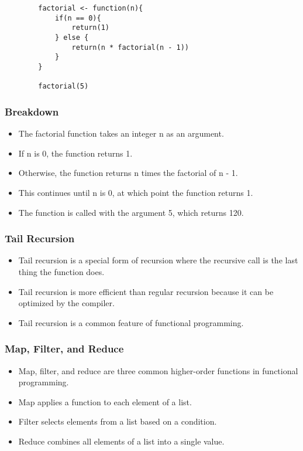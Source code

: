 \documentclass[serif, 9pt, aspectratio=32]{beamer}
\begin{document}
\begin{frame}[fragile]
    \begin{lstlisting}
        factorial <- function(n){
            if(n == 0){
                return(1)
            } else {
                return(n * factorial(n - 1))
            }
        }

        factorial(5)
    \end{lstlisting}
\end{frame}

\begin{frame}
    \centering
    \frametitle{Breakdown}
    \begin{itemize}
        \setlength{\itemsep}{2em}
        \item The factorial function takes an integer n as an argument.
        \item If n is 0, the function returns 1.
        \item Otherwise, the function returns n times the factorial of n - 1.
        \item This continues until n is 0, at which point the function returns 1.
        \item The function is called with the argument 5, which returns 120.
    \end{itemize}
\end{frame}

\begin{frame}
    \centering
    \frametitle{Tail Recursion}
    \begin{itemize}
        \setlength{\itemsep}{2em}
        \item Tail recursion is a special form of recursion where the recursive call is the last thing the function does.
        \item Tail recursion is more efficient than regular recursion because it can be optimized by the compiler.
        \item Tail recursion is a common feature of functional programming.
    \end{itemize}
\end{frame}

\begin{frame}
    \centering
    \frametitle{Map, Filter, and Reduce}
    \begin{itemize}
        \setlength{\itemsep}{2em}
        \item Map, filter, and reduce are three common higher-order functions in functional programming.
        \item Map applies a function to each element of a list.
        \item Filter selects elements from a list based on a condition.
        \item Reduce combines all elements of a list into a single value.
    \end{itemize}
\end{frame}
\end{document}

